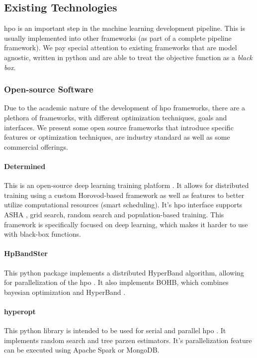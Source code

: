 
\subsection{Existing Technologies}

\acrfull{hpo} is an important step in the machine learning development pipeline. This is usually implemented into other frameworks (as part of a complete pipeline framework). We pay special attention to existing frameworks that are model agnostic, written in \acrfull{python} and are able to treat the objective function as a \textit{black box}.

\subsubsection{Open-source Software}

Due to the academic nature of the development of \acrshort{hpo} frameworks, there are a plethora of frameworks, with different optimization techniques, goals and interfaces. We present some open source frameworks that introduce specific features or optimization techniques, are industry standard as well as some commercial offerings.

\paragraph{Determined} This is an open-source deep learning training platform \parencite{determined-ai}. It allows for distributed training using a custom Horovod-based framework \parencite{alex2018horovod} as well as features to better utilize computational resources (smart scheduling). It's \acrshort{hpo} interface supports ASHA \parencite{li2018massively}, grid search, random search and population-based training. This framework is specifically focused on deep learning, which makes it harder to use with black-box functions.

\paragraph{HpBandSter} This \acrshort{python} package implements a distributed HyperBand algorithm, allowing for parallelization of the \acrshort{hpo} \parencite{hpbandster}. It also implements BOHB, which combines bayesian optimization and HyperBand \parencite{pmlr-v80-falkner18a}.

\paragraph{hyperopt} This \acrshort{python} library is intended to be used for serial and parallel \acrshort{hpo} \parencite{hyperopt}. It implements random search and tree parzen estimators. It's parallelization feature can be executed using Apache Spark or MongoDB.

